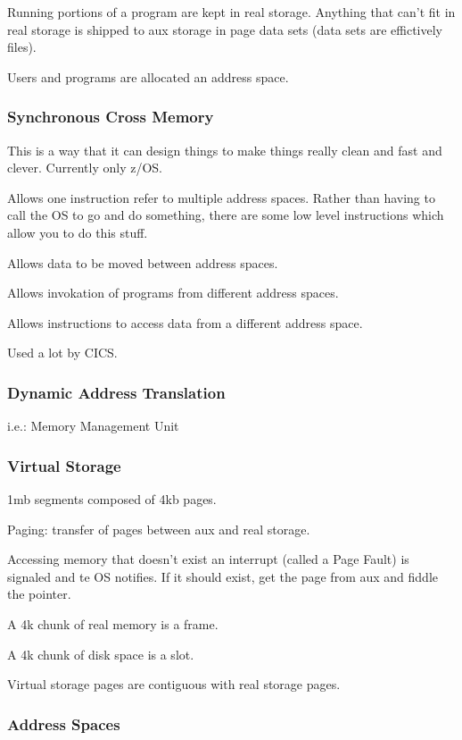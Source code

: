 \documentclass{report}
\begin{document}
Running portions of a program are kept in real storage. Anything that can't fit in real storage is shipped to aux storage in page data sets (data sets are effictively files).

Users and programs are allocated an address space.


\subsubsection{Synchronous Cross Memory}

This is a way that it can design things to make things really clean and fast and clever. Currently only z/OS.

Allows one instruction refer to multiple address spaces. Rather than having to call the OS to go and do something, there are some low level instructions which allow you to do this stuff.

Allows data to be moved between address spaces.

Allows invokation of programs from different address spaces.

Allows instructions to access data from a different address space.

Used a lot by CICS.


\subsubsection{Dynamic Address Translation}

i.e.: Memory Management Unit

\subsubsection{Virtual Storage}

1mb segments composed of 4kb pages.

Paging: transfer of pages between aux and real storage.

Accessing memory that doesn't exist an interrupt (called a Page Fault) is signaled and te OS notifies. If it should exist, get the page from aux and fiddle the pointer.

A 4k chunk of real memory is a frame.

A 4k chunk of disk space is a slot.

Virtual storage pages are contiguous with real storage pages.

\subsubsection{Address Spaces}
\end{document}
